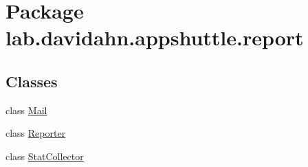 \hypertarget{namespacelab_1_1davidahn_1_1appshuttle_1_1report}{\section{\-Package lab.\-davidahn.\-appshuttle.\-report}
\label{namespacelab_1_1davidahn_1_1appshuttle_1_1report}
}
\subsection*{\-Classes}
\begin{DoxyCompactItemize}
\item 
class \hyperlink{classlab_1_1davidahn_1_1appshuttle_1_1report_1_1_mail}{\-Mail}
\item 
class \hyperlink{classlab_1_1davidahn_1_1appshuttle_1_1report_1_1_reporter}{\-Reporter}
\item 
class \hyperlink{classlab_1_1davidahn_1_1appshuttle_1_1report_1_1_stat_collector}{\-Stat\-Collector}
\end{DoxyCompactItemize}
